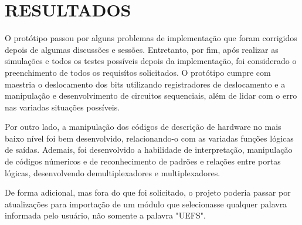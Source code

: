 \chapter{RESULTADOS}
O protótipo passou por alguns problemas de implementação que foram corrigidos depois de algumas discussões e sessões. Entretanto, por fim, após realizar as simulações e todos os testes possíveis depois da implementação, foi considerado o preenchimento de todos os requisítos solicitados. O protótipo cumpre com maestria o deslocamento dos bits utilizando registradores de deslocamento e a manipulação e desenvolvimento de circuitos sequenciais, além de lidar com o erro nas variadas situações possíveis. 

Por outro lado, a manipulação dos códigos de descrição de hardware no mais baixo nível foi bem desenvolvido, relacionando-o com as variadas funções lógicas de saídas. Ademais, foi desenvolvido a habilidade de interpretação, manipulação de códigos númericos e de reconhecimento de padrões e relações entre portas lógicas, desenvolvendo demultiplexadores e multiplexadores.

De forma adicional, mas fora do que foi solicitado, o projeto poderia passar por atualizações para importação de um módulo que selecionasse qualquer palavra informada pelo usuário, não somente a palavra "UEFS".